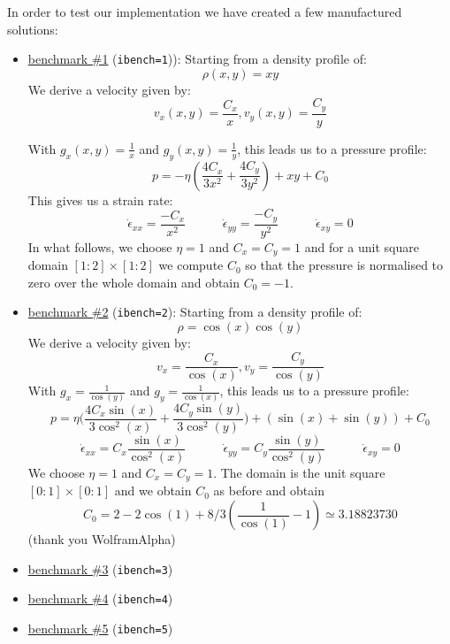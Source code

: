 \newpage
In order to test our implementation we have created a few manufactured solutions:
\begin{itemize}
\item \underline{benchmark \#1} ({\tt ibench=1})): Starting from a density profile of:
\begin{equation}
    \rho(x,y) = xy
\end{equation}
We derive a velocity given by:
\begin{equation}
    v_x(x,y) = \frac{C_x}{x} , v_y(x,y) = \frac{C_y}{y}
\end{equation}

With $g_x(x,y) = \frac{1}{x}$ and $g_y(x,y) = \frac{1}{y}$, this leads us to a pressure profile:
\begin{equation}
    p = - \eta \left( \frac{4C_x}{3x^2} + \frac{4C_y}{3y^2} \right)  + xy + C_0
\end{equation}
This gives us a strain rate:
\[
\dot{\epsilon}_{xx} =  \frac{-C_x}{x^2}
\quad
\quad
\quad
\dot{\epsilon}_{yy} =  \frac{-C_y}{y^2}
\quad
\quad
\quad
\dot{\epsilon}_{xy} = 0 
\]
In what follows, we choose $\eta=1$ and $C_x=C_y=1$ and for a unit square domain $
[1:2]\times[1:2]$ we compute $C_0$
so that the pressure is normalised to zero over the whole domain and obtain $C_0=-1$. 
 
\item \underline{benchmark \#2} ({\tt ibench=2}): Starting from a density profile of:
\begin{equation}
    \rho = \cos(x)\cos(y)
\end{equation}
We derive a velocity given by:
\begin{equation}
    v_x = \frac{C_x}{\cos(x)} , v_y = \frac{C_y}{\cos(y)}
\end{equation}
With $g_x = \frac{1}{\cos(y)}$ and $g_y = \frac{1}{\cos(x)}$, this leads us to a pressure profile:
\begin{equation}
    p =  \eta \Bigg(\frac{4C_x \sin(x)}{3\cos^2(x)} + \frac{4C_y \sin(y)}{3\cos^2(y)}\Bigg) 
    +( \sin(x) + \sin(y) ) + C_0
\end{equation}
\[
\dot{\epsilon}_{xx} = C_x \frac{\sin(x)}{\cos^2(x)}
\quad
\quad
\quad
\dot{\epsilon}_{yy} = C_y \frac{\sin(y)}{\cos^2(y)}
\quad
\quad
\quad
\dot{\epsilon}_{xy} = 0 
\]
We choose $\eta=1$ and $C_x=C_y=1$. The domain is the unit square $[0:1]\times[0:1]$ and we obtain 
$C_0$ as before and obtain 
\[
C_0 = 2 - 2 \cos(1) + 8/3 (\frac{1}{\cos (1)} - 1)
\simeq 3.18823730
\]
(thank you WolframAlpha)


\item \underline{benchmark \#3} ({\tt ibench=3}) 
\item \underline{benchmark \#4} ({\tt ibench=4}) 
\item \underline{benchmark \#5} ({\tt ibench=5}) 
\end{itemize}






